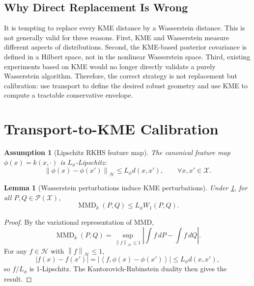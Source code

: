 \documentclass[10pt,journal]{IEEEtran}
\newtheorem{assumption}{Assumption}
\newtheorem{lemma}{Lemma}
\DeclareMathOperator{\MMD}{MMD}
\newcommand{\Pcal}{\mathcal{P}}
\newcommand{\Xcal}{\mathcal{X}}
\newcommand{\Hcal}{\mathcal{H}}
\newcommand{\norm}[1]{\left\lVert #1 \right\rVert}
\newcommand{\ip}[2]{\left\langle #1,#2 \right\rangle}
\begin{document}
\subsection{Why Direct Replacement Is Wrong}

It is tempting to replace every KME distance by a Wasserstein distance. This is not generally valid for three reasons. First, KME and Wasserstein measure different aspects of distributions. Second, the KME-based posterior covariance is defined in a Hilbert space, not in the nonlinear Wasserstein space. Third, existing experiments based on KME would no longer directly validate a purely Wasserstein algorithm. Therefore, the correct strategy is not replacement but calibration: use transport to define the desired robust geometry and use KME to compute a tractable conservative envelope.

\section{Transport-to-KME Calibration}
\label{sec:calibration}

\begin{assumption}[Lipschitz RKHS feature map]
\label{ass:lipschitz}
The canonical feature map $\phi(x)=k(x,\cdot)$ is $L_\phi$-Lipschitz:
\begin{equation}
    \norm{\phi(x)-\phi(x')}_{\Hcal}\le L_\phi d(x,x'),\qquad \forall x,x'\in\Xcal.
\end{equation}
\end{assumption}

\begin{lemma}[Wasserstein perturbations induce KME perturbations]
\label{lem:w-to-mmd}
Under \cref{ass:lipschitz}, for all $P,Q\in\Pcal(\Xcal)$,
\begin{equation}
\label{eq:w-to-mmd}
    \MMD_k(P,Q)\le L_\phi W_1(P,Q).
\end{equation}
\end{lemma}

\begin{proof}
By the variational representation of MMD,
\begin{equation}
    \MMD_k(P,Q)=\sup_{\norm{f}_{\Hcal}\le 1}\left|\int f\,dP-\int f\,dQ\right|.
\end{equation}
For any $f\in\Hcal$ with $\norm{f}_{\Hcal}\le 1$,
\begin{equation}
    |f(x)-f(x')|=|\ip{f}{\phi(x)-\phi(x')}|\le L_\phi d(x,x'),
\end{equation}
so $f/L_\phi$ is 1-Lipschitz. The Kantorovich-Rubinstein duality then gives the result.
\end{proof}
\end{document}
